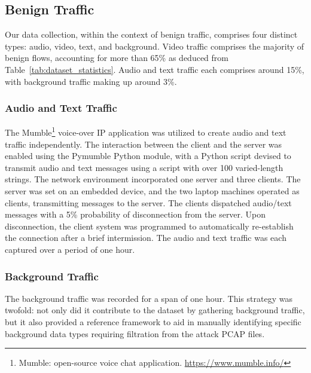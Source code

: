 \documentclass[lettersize,journal]{IEEEtran}
\begin{document}
\subsection{Benign Traffic} \label{sec:ben_traffic}

Our data collection, within the context of benign traffic, comprises four distinct types: audio, video, text, and background. Video traffic comprises the majority of benign flows, accounting for more than 65\% as deduced from Table~\ref{tab:dataset_statistics}. Audio and text traffic each comprises around 15\%, with background traffic making up around 3\%.

\subsubsection{Audio and Text Traffic}\label{sec:audio_text}
The Mumble\footnote{Mumble: open-source voice chat application. \url{https://www.mumble.info/}} voice-over \ac{IP} application was utilized to create audio and text traffic independently. The interaction between the client and the server was enabled using the Pymumble Python module, with a Python script devised to transmit audio and text messages using a script with over 100 varied-length strings. The network environment incorporated one server and three clients. The server was set on an embedded device, and the two laptop machines operated as clients, transmitting messages to the server. The clients dispatched audio/text messages with a 5\% probability of disconnection from the server. Upon disconnection, the client system was programmed to automatically re-establish the connection after a brief intermission. The audio and text traffic was each captured over a period of one hour. 



\subsubsection{Background Traffic}\label{sec:background}
The background traffic was recorded for a span of one hour. This strategy was twofold: not only did it contribute to the dataset by gathering background traffic, but it also provided a reference framework to aid in manually identifying specific background data types requiring filtration from the attack \ac{PCAP} files.
\end{document}
